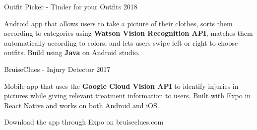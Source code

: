 \begin{cventries}
  \cventry
    {Outfit Picker - Tinder for your Outfits} %
    {} %
    {} %
    {2018} %
    {
      \begin{cvitems} %
        \item {Android app that allows users to take a picture of their clothes, sorts them according to categories using \textbf{Watson Vision  Recognition API}, matches them automatically according to colors, and lets users swipe left or right to choose outfits. Build using \textbf{Java} on Android studio.}
      \end{cvitems}
    }

  \cventry
    {BruiseClues - Injury Detector} %
    {} %
    {} %
    {2017} %
    {
      \begin{cvitems} %
        \item {Mobile app that uses the \textbf{Google Cloud Vision API} to identify injuries in pictures while giving relevant treatment information to users. Built with Expo in React Native and works on both Android and iOS.}
        \item {Download the app through Expo on bruiseclues.com}
      \end{cvitems}
    }

\end{cventries}
